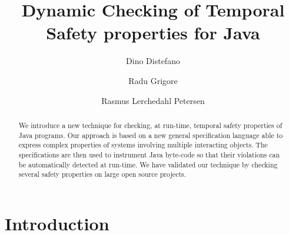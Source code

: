\documentclass{llncs} %
\title{Dynamic Checking of Temporal Safety properties for Java}
\author{Dino Distefano \and Radu Grigore \and Rasmus Lerchedahl Petersen}
\institute{Queen Mary University of London }
\begin{document}
\maketitle

\begin{abstract} %
We introduce a new technique for checking, at run-time, temporal safety properties of Java programs.
Our approach is based on a new general specification language able to express complex properties of 
systems involving multiple interacting objects. The specifications are then used to instrument Java byte-code so that their violations can be automatically detected at run-time. 
We have validated our technique by checking several safety properties on large open source projects.
\end{abstract}


\section{Introduction} %
\end{document}
